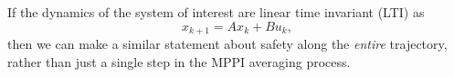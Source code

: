\documentclass[letterpaper, 10 pt, conference]{ieeeconf}
\begin{document}

If the dynamics of the system of interest are linear time invariant (LTI) as
\begin{equation}
    x_{k+1}=Ax_k + Bu_k,\label{eq:lti}
\end{equation}
then we can make a similar statement about safety along the \textit{entire} trajectory, rather than just a single step in the MPPI averaging process.
\end{document}

